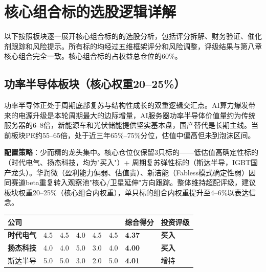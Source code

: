 \section{核心组合标的选股逻辑详解}

以下按照板块逐一展开核心组合标的的选股分析，包括评分拆解、财务验证、催化剂跟踪和风险提示。所有标的均经过五维框架评分和风险调整，评级结果与第八章核心组合完全一致。核心组合标的占权益总仓位的60\%。

\subsection{功率半导体板块（核心权重20--25\%）}

功率半导体正处于周期底部复苏与结构性成长的双重逻辑交汇点。AI算力爆发带来的电源升级是本轮周期最大的边际增量，AI服务器功率半导体价值量约为传统服务器的6--8倍，新能源车和光伏储能提供坚实基本盘，国产替代是长期主线。当前板块PE约55--65倍，处于近三年65\%--75\%分位，估值中偏高但未到泡沫区间。

\textbf{配置策略}：少而精的龙头集中。核心仓位仅保留3只标的——低估值高确定性标的（时代电气、扬杰科技，均为"买入"）+ 周期复苏弹性标的（斯达半导，IGBT国产龙头）。华润微（盈利能力偏弱、估值贵）、新洁能（Fabless模式确定性弱）因同赛道beta重复转入观察池"核心/卫星延伸"方向跟踪。整体维持超配评级，建议板块权重20--25\%（核心组合内权重），单只标的组合内权重提升至4--6\%以表达信念。

\begin{exhibitbox}
\centering
\scriptsize
\setlength{\tabcolsep}{2pt}

\begin{tabularx}{\linewidth}{X C{1.4cm} C{1.4cm} C{1.4cm} C{1.4cm} C{1.4cm} C{1.4cm} C{1.6cm}}
\toprule
\textbf{公司} & \textbf{} & \textbf{} & \textbf{} & \textbf{} & \textbf{} & \textbf{综合得分} & \textbf{投资评级} \\
\midrule
{}
\textbf{时代电气} & 4.5 & 4.5 & 4.0 & 4.5 & 4.5 & \textbf{4.37} & \textcolor{riskgreen}{\textbf{买入}} \\
\textbf{扬杰科技} & 4.0 & 4.0 & 5.0 & 3.0 & 4.0 & \textbf{4.00} & \textcolor{riskgreen}{\textbf{买入}} \\
\hline
{}
斯达半导 & 5.0 & 5.0 & 3.0 & 2.0 & 5.0 & \textbf{4.01} & 增持 \\
\bottomrule
\end{tabularx}
\end{exhibitbox}

